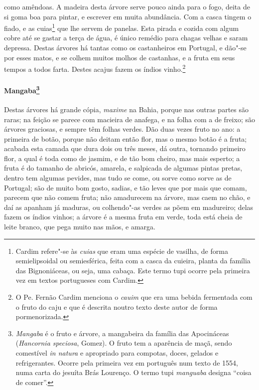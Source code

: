 como amêndoas. A madeira desta árvore serve pouco ainda para o fogo,
deita de si goma boa para pintar, e escrever em muita abundância. Com a
casca tingem o fiado, e as cuias\footnote{ Cardim refere"-se às
\textit{cuias} que eram uma espécie de vasilha, de forma
semielipsoidal ou semiesférica, feita com a casca da cuieira, planta
da família das Bignoniáceas, ou seja, uma cabaça. Este termo tupi
ocorre pela primeira vez em textos portugueses com Cardim.} que lhe
servem de panelas. Esta pirada e cozida com algum cobre até se gastar a
terça de água, é único remédio para chagas velhas e saram depressa.
Destas árvores há tantas como os castanheiros em Portugal, e dão"-se por
esses matos, e se colhem muitos molhos de castanhas, e a fruta em seus
tempos a todos farta. Destes acajus fazem os índios vinho.\footnote{ O
Pe. Fernão Cardim menciona o \textit{cauim} que era uma bebida
fermentada com o fruto do caju e que é descrita noutro texto deste
autor de forma pormenorizada.} 

\paragraph{Mangaba\footnote{ \textit{Mangaba} é o fruto e árvore, a
mangabeira da família das Apocináceas (\textit{Hancornia speciosa}, 
Gomez). O fruto tem a aparência de maçã, sendo comestível \textit{in
natura} e apropriado para compotas, doces, gelados e refrigerantes.
Ocorre pela primeira vez em português num texto de 1554, numa
carta do jesuíta Brás Lourenço. O termo tupi \textit{manguaba}
designa ``coisa de comer''.}} Destas árvores há grande cópia, 
\textit{maxime} na Bahia, porque nas outras partes são raras; na feição se
parece com macieira de anafega, e na folha com a de freixo; são árvores
graciosas, e sempre têm folhas verdes. Dão duas vezes fruto no ano: a
primeira de botão, porque não deitam então flor, mas o mesmo botão é a
fruta; acabada esta camada que dura dois ou três meses, dá outra,
tornando primeiro flor, a qual é toda como de jasmim, e de tão bom
cheiro, mas mais esperto; a fruta é do tamanho de abricós, amarela, e
salpicada de algumas pintas pretas, dentro tem algumas pevides, mas
tudo se come, ou sorve como sorve as de Portugal; são de muito bom
gosto, sadias, e tão leves que por mais que comam, parecem que não
comem fruta; não amadurecem na árvore, mas caem no chão, e daí as
apanham já maduras, ou colhendo"-as verdes as põem em madureiro; delas
fazem os índios vinhos; a árvore é a mesma fruta em verde, toda está
cheia de leite branco, que pega muito nas mãos, e amarga.

